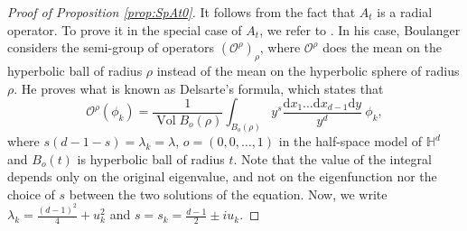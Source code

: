\documentclass[]{scrartcl}
\renewcommand{\d}{\mathrm{d}}
\DeclareMathOperator{\Vol}{Vol}
\numberwithin{equation}{section}
\numberwithin{figure}{section}
\begin{document}
\begin{proof}[Proof of Proposition \ref{prop:SpAt0}]
	It follows from the fact that $A_t$ is a radial operator.
	To prove it in the special case of $A_t$, we refer to \cite[Proposition A.1]{Boulanger}. In his case, Boulanger considers the semi-group of operators $\left(\mathcal{O}^{\rho}\right)_\rho$, where $\mathcal{O}^{\rho}$ does the mean on the hyperbolic ball of radius $\rho$ instead of the mean on the hyperbolic sphere of radius $\rho$. He proves what is known as Delsarte's formula, which states that \begin{equation}\label{Boul}\mathcal{O}^{\rho}(\phi_k) = \frac{1}{\Vol {B_o(\rho)} }\int_{B_o(\rho)}{ y^s}{ \frac{\d x_1\dots \d x_{d-1} \d y}{y^d}} \ \phi_k,\end{equation} where $s(d-1-s)  = \lambda_k = \lambda$, $o = (0, 0,\dots, 1)$ in the half-space model of $\mathds H^d$ and $B_o(t)$ is hyperbolic ball of radius $t$. Note that the value of the integral depends only on the original eigenvalue, and not on the eigenfunction nor the choice of $s$ between the two solutions of the equation.		
	Now, we write $\lambda_k = \frac{(d-1)^2}{4}+u_k^2$ and $s =s_k= \frac{d-1}{2} \pm i u_k$.
	

\end{proof}
\end{document}
